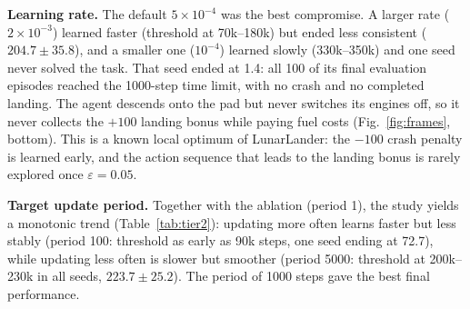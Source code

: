 \documentclass[10pt,twocolumn,letterpaper]{article}
\newcommand{\eps}{\varepsilon}
\begin{document}
\textbf{Learning rate.} The default $5\times10^{-4}$ was the best compromise. A larger rate ($2\times10^{-3}$) learned faster (threshold at 70k--180k) but ended less consistent ($204.7\pm35.8$), and a smaller one ($10^{-4}$) learned slowly (330k--350k) and one seed never solved the task. That seed ended at 1.4: all 100 of its final evaluation episodes reached the 1000-step time limit, with no crash and no completed landing. The agent descends onto the pad but never switches its engines off, so it never collects the $+100$ landing bonus while paying fuel costs (Fig.~\ref{fig:frames}, bottom). This is a known local optimum of LunarLander: the $-100$ crash penalty is learned early, and the action sequence that leads to the landing bonus is rarely explored once $\eps=0.05$.

\textbf{Target update period.} Together with the ablation (period 1), the study yields a monotonic trend (Table~\ref{tab:tier2}): updating more often learns faster but less stably (period 100: threshold as early as 90k steps, one seed ending at 72.7), while updating less often is slower but smoother (period 5000: threshold at 200k--230k in all seeds, $223.7\pm25.2$). The period of 1000 steps gave the best final performance.

\begin{table}[t]
\centering
\caption{Tier 2: DQN on LunarLander-v3 (500k steps, 3 seeds, 100 greedy episodes per seed). $\Delta Q_0$: estimated minus actual discounted value of the initial state at the end of training. Times are inflated by concurrent execution (Section 4) and only comparable within this table.}
\label{tab:tier2}
\small
{}
\end{table}
\end{document}
